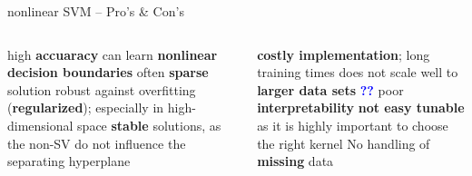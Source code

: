 
\begin{frame}{nonlinear SVM -- Pro's \& Con's}

\footnotesize

\begin{columns}[onlytextwidth]
  \begin{column}{0.5\textwidth}
    \footnotesize
    \begin{itemize}
      \positem high \textbf{accuaracy}
      \positem can learn \textbf{nonlinear decision boundaries}
      \positem often \textbf{sparse} solution
      \positem robust against overfitting (\textbf{regularized}); especially in 
      high-dimensional space 
      \positem \textbf{stable} solutions, as the non-SV do not influence the 
      separating hyperplane
    \end{itemize}
  \end{column}

  \begin{column}{0.5\textwidth}
    \footnotesize
    \begin{itemize}
      \negitem \textbf{costly implementation}; long training times
      \negitem does not scale well to \textbf{larger data sets} 
      \textcolor{blue}{\textbf{??}}
      \negitem poor \textbf{interpretability}
      \negitem \textbf{not easy tunable} as it is highly important to choose the 
      right kernel
      \negitem No handling of \textbf{missing} data
      
    \end{itemize}
  \end{column}
\end{columns}

\vfill

\small


\end{frame}


